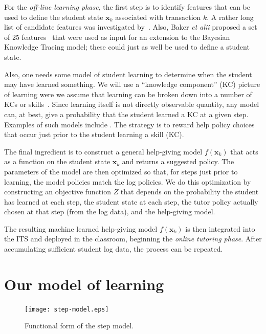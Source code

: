 \documentclass{edm_template}
\begin{document}
For the {\em off-line learning phase}, the first step is to identify
features that can be used to define the student state $\mathbf{x}_k$
associated with transaction $k$.  A rather
long list of candidate features was investigated
by~\cite{chi_micro-level_2009}.  Also, Baker {\em et alii} proposed
a set of 25 features~\citeyear{baker_more_2008} that were used as input 
for an extension to the Bayesian Knowledge Tracing model;  these
could just as well be used to define a student state.

Also, one needs some model of student learning to determine when the
student may have learned something.  We will use a ``knowledge
component'' (KC) picture of learning were we assume that learning can be
broken down into a number of KCs or skills~\cite{vanlehn_behavior_2006}.  
Since learning itself is not directly observable quantity, any model
can, at best, give a probability that the student learned a KC at a
given step.  Examples of such models include
\cite{van_de_sande_measuring_2013,baker_detecting_2010}. 
The strategy is to reward help policy choices that occur just prior to
the student learning a skill (KC).

The final ingredient is to construct a general help-giving model $f(\mathbf{x}_k)$ that
acts as a function on the student state $\mathbf{x}_k$  and returns a suggested policy.
The parameters of the model are then optimized so that, for steps
just prior to learning, the model policies match the log policies.
We do this optimization by constructing an objective function $Z$ that
depends on the probability the student has learned at each step, the
student state at each step,  the tutor policy actually chosen at
that step (from the log data), and the help-giving model.

The resulting machine learned help-giving model $f(\mathbf{x}_k)$ is
then integrated into the  ITS and deployed in the classroom, beginning
the {\em online tutoring phase}.  After accumulating sufficient student log data,
the process can be repeated.


\section{Our model of learning}

\begin{figure}
\centering    \texttt{[image: step-model.eps]}
  \caption{Functional form of the step model.}
         \label{stepf}
\end{figure}
\end{document}
